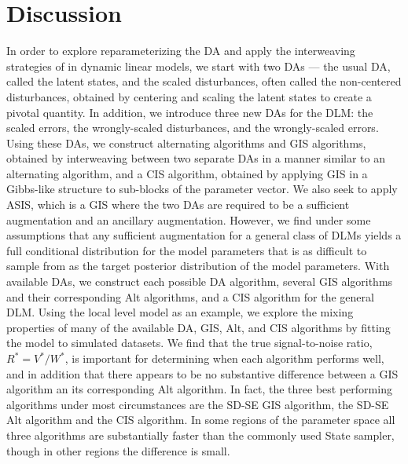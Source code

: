 \documentclass[12pt]{article}
\begin{document}
\section{Discussion}\label{sec:Discuss}

In order to explore reparameterizing the DA and apply the interweaving strategies of \citet{yu2011center} in dynamic linear models, we start with two DAs --- the usual DA, called the latent states, and the scaled disturbances, often called the non-centered disturbances, obtained by centering and scaling the latent states to create a pivotal quantity. In addition, we introduce three new DAs for the DLM: the scaled errors, the wrongly-scaled disturbances, and the wrongly-scaled errors. Using these DAs, we construct alternating algorithms and GIS algorithms, obtained by interweaving between two separate DAs in a manner similar to an alternating algorithm, and a CIS algorithm, obtained by applying GIS in a Gibbs-like structure to sub-blocks of the parameter vector. We also seek to apply ASIS, which is a GIS where the two DAs are required to be a sufficient augmentation and an ancillary augmentation. However, we find under some assumptions that any sufficient augmentation for a general class of DLMs yields a full conditional distribution for the model parameters that is as difficult to sample from as the target posterior distribution of the model parameters. With available DAs, we construct each possible DA algorithm, several GIS algorithms and their corresponding Alt algorithms, and a CIS algorithm for the general DLM. Using the local level model as an example, we explore the mixing properties of many of the available DA, GIS, Alt, and CIS algorithms by fitting the model to simulated datasets. We find that the true signal-to-noise ratio, $R^*=V^*/W^*$, is important for determining when each algorithm performs well, and in addition that there appears to be no substantive difference between a GIS algorithm an its corresponding Alt algorithm. In fact, the three best performing algorithms under most circumstances are the SD-SE GIS algorithm, the SD-SE Alt algorithm and the CIS algorithm. In some regions of the parameter space all three algorithms are substantially faster than the commonly used State sampler, though in other regions the difference is small.
\end{document}
